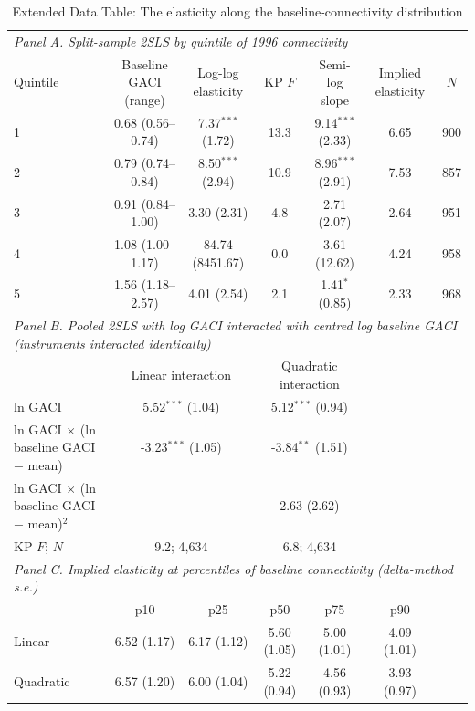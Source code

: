 \begin{table}[htbp]
\centering
\begin{threeparttable}
\caption{Extended Data Table: The elasticity along the baseline-connectivity distribution}
\label{tab:gradient}
\footnotesize
\begin{tabular}{lcccccc}
\toprule
\multicolumn{7}{l}{\textit{Panel A. Split-sample 2SLS by quintile of 1996 connectivity}} \\
Quintile & Baseline GACI (range) & Log-log elasticity & KP $F$ & Semi-log slope & Implied elasticity & $N$ \\
\midrule
  1 & 0.68 (0.56--0.74) & 7.37$^{***}$ (1.72) & 13.3 & 9.14$^{***}$ (2.33) & 6.65 & 900 \\
  2 & 0.79 (0.74--0.84) & 8.50$^{***}$ (2.94) & 10.9 & 8.96$^{***}$ (2.91) & 7.53 & 857 \\
  3 & 0.91 (0.84--1.00) & 3.30 (2.31) & 4.8 & 2.71 (2.07) & 2.64 & 951 \\
  4 & 1.08 (1.00--1.17) & 84.74 (8451.67) & 0.0 & 3.61 (12.62) & 4.24 & 958 \\
  5 & 1.56 (1.18--2.57) & 4.01 (2.54) & 2.1 & 1.41$^{*}$ (0.85) & 2.33 & 968 \\
\midrule
\multicolumn{7}{l}{\textit{Panel B. Pooled 2SLS with log GACI interacted with centred log baseline GACI (instruments interacted identically)}} \\
 & \multicolumn{2}{c}{Linear interaction} & \multicolumn{2}{c}{Quadratic interaction} & & \\
  ln GACI & \multicolumn{2}{c}{5.52$^{***}$ (1.04)} & \multicolumn{2}{c}{5.12$^{***}$ (0.94)} & & \\
  ln GACI $\times$ (ln baseline GACI $-$ mean) & \multicolumn{2}{c}{-3.23$^{***}$ (1.05)} & \multicolumn{2}{c}{-3.84$^{**}$ (1.51)} & & \\
  ln GACI $\times$ (ln baseline GACI $-$ mean)$^2$ & \multicolumn{2}{c}{--} & \multicolumn{2}{c}{2.63 (2.62)} & & \\
  KP $F$; $N$ & \multicolumn{2}{c}{9.2; 4,634} & \multicolumn{2}{c}{6.8; 4,634} & & \\
\midrule
\multicolumn{7}{l}{\textit{Panel C. Implied elasticity at percentiles of baseline connectivity (delta-method s.e.)}} \\
 & p10 & p25 & p50 & p75 & p90 & \\
  Linear & 6.52 (1.17) & 6.17 (1.12) & 5.60 (1.05) & 5.00 (1.01) & 4.09 (1.01) & \\
  Quadratic & 6.57 (1.20) & 6.00 (1.04) & 5.22 (0.94) & 4.56 (0.93) & 3.93 (0.97) & \\

\end{tabular}
\end{threeparttable}
\end{table}
